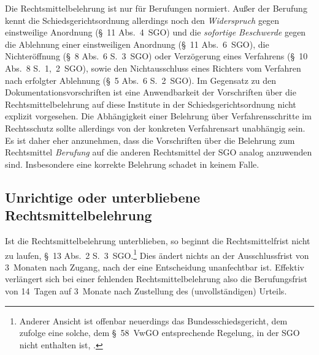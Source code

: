 Die Rechtsmittelbelehrung ist nur für Berufungen normiert.
Außer der Berufung kennt die Schiedsgerichtsordnung allerdings noch den \emph{Widerspruch} gegen einstweilige Anordnung (\S~11 Abs.~4~SGO) und die \emph{sofortige Beschwerde} gegen die Ablehnung einer einstweiligen Anordnung (\S~11 Abs.~6~SGO), die Nichteröffnung (\S~8 Abs.~6 S.~3~SGO) oder Verzögerung eines Verfahrens (\S~10 Abs.~8 S.~1,~2~SGO), sowie den Nichtausschluss eines Richters vom Verfahren nach erfolgter Ablehnung (\S~5 Abs.~6 S.~2~SGO).
Im Gegensatz zu den Dokumentationsvorschriften ist eine Anwendbarkeit der Vorschriften über die Rechtsmittelbelehrung auf diese Institute in der Schiedsgerichtsordnung nicht explizit vorgesehen.
Die Abhängigkeit einer Belehrung über Verfahrensschritte im Rechtsschutz sollte allerdings von der konkreten Verfahrensart unabhängig sein.
Es ist daher eher anzunehmen, dass die Vorschriften über die Belehrung zum Rechtsmittel \emph{Berufung} auf die anderen Rechtsmittel der SGO analog anzuwenden sind.
Insbesondere eine korrekte Belehrung schadet in keinem Falle.

\subsection{Unrichtige oder unterbliebene Rechtsmittelbelehrung}
\label{Urteilsaufbau:Rechtsmittelbelehrung:Falsch}
Ist die Rechtsmittelbelehrung unterblieben, so beginnt die Rechtsmittelfrist nicht zu laufen, \S~13 Abs.~2 S.~3~SGO.\footnote{Anderer Ansicht ist offenbar neuerdings das Bundesschiedsgericht, dem zufolge eine solche, dem \S~58~VwGO entsprechende Regelung, in der SGO nicht enthalten ist, \cite{BSGPP100132493}.}
Dies ändert nichts an der Ausschlussfrist von 3~Monaten nach Zugang, nach der eine Entscheidung unanfechtbar ist.
Effektiv verlängert sich bei einer fehlenden Rechtsmittelbelehrung also die Berufungsfrist von 14~Tagen auf 3~Monate nach Zustellung des (unvollständigen) Urteils.


